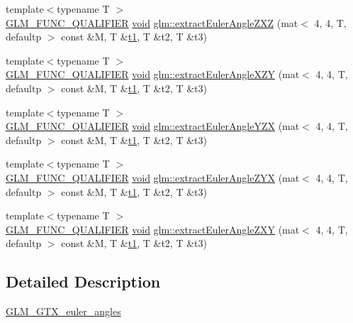 \begin{DoxyCompactItemize}
\item 
{\footnotesize template$<$typename T $>$ }\\\hyperlink{setup_8hpp_a33fdea6f91c5f834105f7415e2a64407}{G\+L\+M\+\_\+\+F\+U\+N\+C\+\_\+\+Q\+U\+A\+L\+I\+F\+I\+ER} \hyperlink{_s_d_l__opengles2__gl2ext_8h_ae5d8fa23ad07c48bb609509eae494c95}{void} \hyperlink{group__gtx__euler__angles_ga59359fef9bad92afaca55e193f91e702}{glm\+::extract\+Euler\+Angle\+Z\+XZ} (mat$<$ 4, 4, T, defaultp $>$ const \&M, T \&\hyperlink{_s_d_l__opengl__glext_8h_af48031a37b713afa3b0d0d7d29653d7c}{t1}, T \&t2, T \&t3)
\item 
{\footnotesize template$<$typename T $>$ }\\\hyperlink{setup_8hpp_a33fdea6f91c5f834105f7415e2a64407}{G\+L\+M\+\_\+\+F\+U\+N\+C\+\_\+\+Q\+U\+A\+L\+I\+F\+I\+ER} \hyperlink{_s_d_l__opengles2__gl2ext_8h_ae5d8fa23ad07c48bb609509eae494c95}{void} \hyperlink{group__gtx__euler__angles_gabe5a65d8eb1cd873c8de121cce1a15ed}{glm\+::extract\+Euler\+Angle\+X\+ZY} (mat$<$ 4, 4, T, defaultp $>$ const \&M, T \&\hyperlink{_s_d_l__opengl__glext_8h_af48031a37b713afa3b0d0d7d29653d7c}{t1}, T \&t2, T \&t3)
\item 
{\footnotesize template$<$typename T $>$ }\\\hyperlink{setup_8hpp_a33fdea6f91c5f834105f7415e2a64407}{G\+L\+M\+\_\+\+F\+U\+N\+C\+\_\+\+Q\+U\+A\+L\+I\+F\+I\+ER} \hyperlink{_s_d_l__opengles2__gl2ext_8h_ae5d8fa23ad07c48bb609509eae494c95}{void} \hyperlink{group__gtx__euler__angles_ga9049b78466796c0de2971756e25b93d3}{glm\+::extract\+Euler\+Angle\+Y\+ZX} (mat$<$ 4, 4, T, defaultp $>$ const \&M, T \&\hyperlink{_s_d_l__opengl__glext_8h_af48031a37b713afa3b0d0d7d29653d7c}{t1}, T \&t2, T \&t3)
\item 
{\footnotesize template$<$typename T $>$ }\\\hyperlink{setup_8hpp_a33fdea6f91c5f834105f7415e2a64407}{G\+L\+M\+\_\+\+F\+U\+N\+C\+\_\+\+Q\+U\+A\+L\+I\+F\+I\+ER} \hyperlink{_s_d_l__opengles2__gl2ext_8h_ae5d8fa23ad07c48bb609509eae494c95}{void} \hyperlink{group__gtx__euler__angles_ga2d6c11a4abfa60c565483cee2d3f7665}{glm\+::extract\+Euler\+Angle\+Z\+YX} (mat$<$ 4, 4, T, defaultp $>$ const \&M, T \&\hyperlink{_s_d_l__opengl__glext_8h_af48031a37b713afa3b0d0d7d29653d7c}{t1}, T \&t2, T \&t3)
\item 
{\footnotesize template$<$typename T $>$ }\\\hyperlink{setup_8hpp_a33fdea6f91c5f834105f7415e2a64407}{G\+L\+M\+\_\+\+F\+U\+N\+C\+\_\+\+Q\+U\+A\+L\+I\+F\+I\+ER} \hyperlink{_s_d_l__opengles2__gl2ext_8h_ae5d8fa23ad07c48bb609509eae494c95}{void} \hyperlink{group__gtx__euler__angles_ga81fbbca2ba0c778b9662d5355b4e2363}{glm\+::extract\+Euler\+Angle\+Z\+XY} (mat$<$ 4, 4, T, defaultp $>$ const \&M, T \&\hyperlink{_s_d_l__opengl__glext_8h_af48031a37b713afa3b0d0d7d29653d7c}{t1}, T \&t2, T \&t3)
\end{DoxyCompactItemize}


\subsection{Detailed Description}
\hyperlink{group__gtx__euler__angles}{G\+L\+M\+\_\+\+G\+T\+X\+\_\+euler\+\_\+angles} 